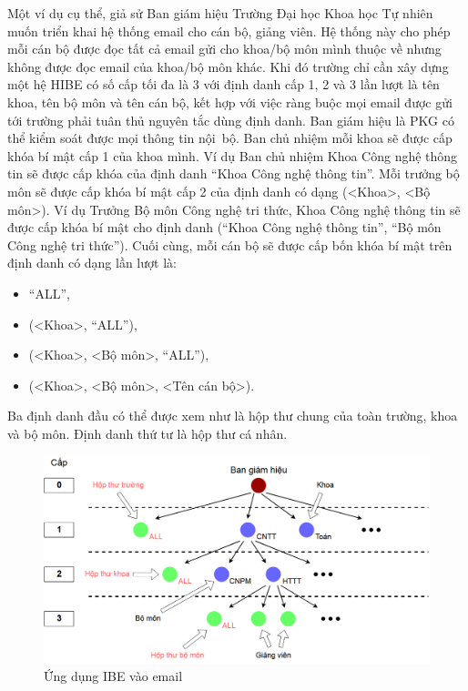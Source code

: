 \documentclass[class=report, crop=false]{standalone}
\begin{document}
			Một ví dụ cụ thể, giả sử Ban giám hiệu Trường Đại học Khoa học Tự nhiên muốn triển khai hệ thống email cho cán bộ, giảng viên. Hệ thống này cho phép mỗi cán bộ được đọc tất cả email gửi cho khoa/bộ môn mình thuộc về nhưng không được đọc email của khoa/bộ môn khác. Khi đó trường chỉ cần xây dựng một hệ HIBE có số cấp tối đa là 3 với định danh cấp 1, 2 và 3 lần lượt là tên khoa, tên bộ môn và tên cán bộ, kết hợp với việc ràng buộc mọi email được gửi tới trường phải tuân thủ nguyên tắc dùng định danh. Ban giám hiệu là PKG có thể kiểm soát được mọi thông tin nội~bộ. Ban chủ nhiệm mỗi khoa sẽ được cấp khóa bí mật cấp 1 của khoa mình. Ví dụ Ban chủ nhiệm Khoa Công nghệ thông tin sẽ được cấp khóa của định danh ``Khoa Công nghệ thông tin''. Mỗi trưởng bộ môn sẽ được cấp khóa bí mật cấp 2 của định danh có dạng (<Khoa>, <Bộ môn>). Ví dụ Trưởng Bộ môn Công nghệ tri thức, Khoa Công nghệ thông tin sẽ được cấp khóa bí mật cho định danh (``Khoa Công nghệ thông tin'', ``Bộ môn Công nghệ tri thức''). Cuối cùng, mỗi cán bộ sẽ được cấp bốn khóa bí mật trên định danh có dạng lần lượt là:
			\begin{itemize}[itemindent=1cm]
				\item[] ``ALL'',
				\item[] (<Khoa>, ``ALL''),
				\item[] (<Khoa>, <Bộ môn>, ``ALL''),
				\item[] (<Khoa>, <Bộ môn>, <Tên cán bộ>).
			\end{itemize}
			
			Ba định danh đầu có thể được xem như là hộp thư chung của toàn trường, khoa và bộ môn. Định danh thứ tư là hộp thư cá nhân.
			\begin{figure}[h] 
				\captionsetup{font=normalsize}
				\includegraphics[width=\textwidth]{application_email.png}
				\centering
				\caption{Ứng dụng IBE vào email}
			\end{figure}
\end{document}

